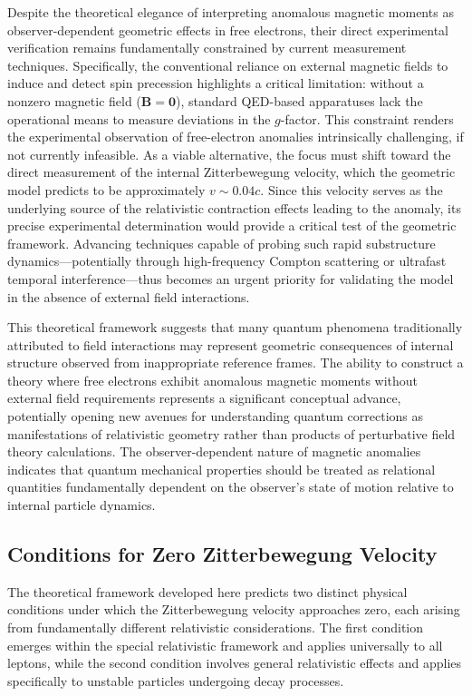 \documentclass[%
 reprint,
 amsmath,amssymb,
 aps,
]{revtex4-1}
\numberwithin{equation}{section}%
\begin{document}
Despite the theoretical elegance of interpreting anomalous magnetic moments as observer-dependent geometric effects in free electrons, their direct experimental verification remains fundamentally constrained by current measurement techniques. Specifically, the conventional reliance on external magnetic fields to induce and detect spin precession highlights a critical limitation: without a nonzero magnetic field ($\mathbf{B} = \mathbf{0}$), standard QED-based apparatuses lack the operational means to measure deviations in the $g$-factor. This constraint renders the experimental observation of free-electron anomalies intrinsically challenging, if not currently infeasible. As a viable alternative, the focus must shift toward the direct measurement of the internal Zitterbewegung velocity, which the geometric model predicts to be approximately $v \sim 0.04c$. Since this velocity serves as the underlying source of the relativistic contraction effects leading to the anomaly, its precise experimental determination would provide a critical test of the geometric framework. Advancing techniques capable of probing such rapid substructure dynamics---potentially through high-frequency Compton scattering or ultrafast temporal interference---thus becomes an urgent priority for validating the model in the absence of external field interactions.

This theoretical framework suggests that many quantum phenomena traditionally attributed to field interactions may represent geometric consequences of internal structure observed from inappropriate reference frames. The ability to construct a theory where free electrons exhibit anomalous magnetic moments without external field requirements represents a significant conceptual advance, potentially opening new avenues for understanding quantum corrections as manifestations of relativistic geometry rather than products of perturbative field theory calculations. The observer-dependent nature of magnetic anomalies indicates that quantum mechanical properties should be treated as relational quantities fundamentally dependent on the observer's state of motion relative to internal particle dynamics.

\subsection{Conditions for Zero Zitterbewegung Velocity}

The theoretical framework developed here predicts two distinct physical conditions under which the Zitterbewegung velocity approaches zero, each arising from fundamentally different relativistic considerations. The first condition emerges within the special relativistic framework and applies universally to all leptons, while the second condition involves general relativistic effects and applies specifically to unstable particles undergoing decay processes.
\end{document}
